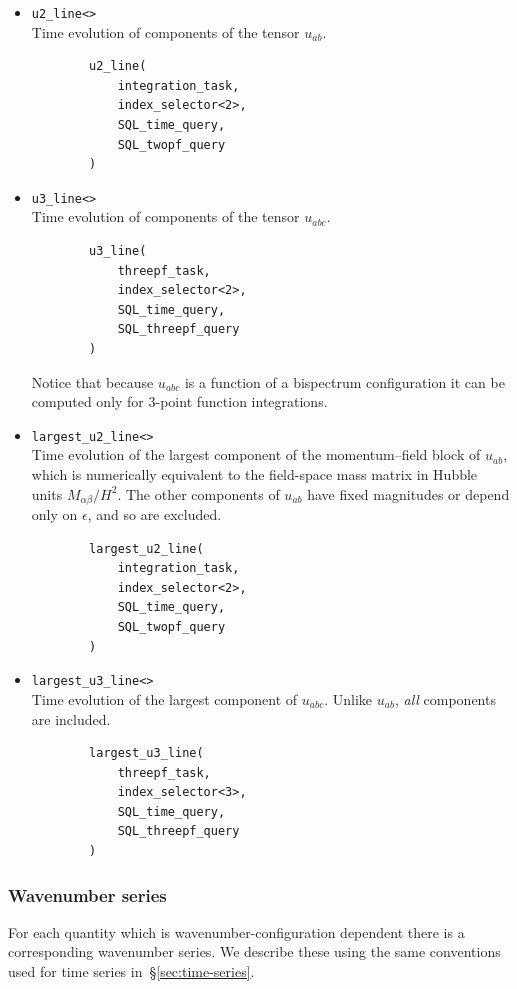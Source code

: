 \documentclass[11pt,a4paper]{article}
\begin{document}
\begin{itemize}
    \item \texttt{u2_line<>} \\
    Time evolution of components of the tensor $u_{ab}$.
    \begin{verbatim}
        u2_line(
            integration_task,
            index_selector<2>,
            SQL_time_query,
            SQL_twopf_query
        )
    \end{verbatim}

    \item \texttt{u3_line<>} \\
    Time evolution of components of the tensor $u_{abc}$.
    \begin{verbatim}
        u3_line(
            threepf_task,
            index_selector<2>,
            SQL_time_query,
            SQL_threepf_query
        )    
    \end{verbatim}
    Notice that because $u_{abc}$ is a function of a bispectrum configuration
    it can be computed only for 3-point function integrations.
    
    \item \texttt{largest_u2_line<>} \\
    Time evolution of the largest component of the momentum--field block
    of $u_{ab}$, which is numerically equivalent to the field-space
    mass matrix in Hubble units $M_{\alpha\beta}/H^2$.
    The other components of $u_{ab}$ have fixed magnitudes or depend only
    on $\epsilon$, and so are excluded.
    \begin{verbatim}
        largest_u2_line(
            integration_task,
            index_selector<2>,
            SQL_time_query,
            SQL_twopf_query
        )
    \end{verbatim}

    \item \texttt{largest_u3_line<>} \\
    Time evolution of the largest component of $u_{abc}$.
    Unlike $u_{ab}$, \emph{all} components are included.
    \begin{verbatim}
        largest_u3_line(
            threepf_task,
            index_selector<3>,
            SQL_time_query,
            SQL_threepf_query
        )    
    \end{verbatim}

\end{itemize}

\subsubsection{Wavenumber series}
\label{sec:wavenumber-series}
For each quantity which is wavenumber-configuration dependent there is a corresponding
wavenumber series.
We describe these using the same conventions used for time series
in~\S\ref{sec:time-series}.
\end{document}
